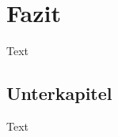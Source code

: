 \chapter{Fazit}
\label{Kapitel:Einleitung}
Text


\section{Unterkapitel}
\label{Abschnitt:Motivation}


Text
